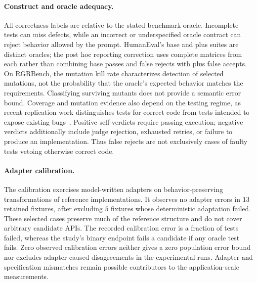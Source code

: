 \documentclass{article}
\begin{document}
\paragraph{Construct and oracle adequacy.} All correctness labels are relative to the stated
benchmark oracle. Incomplete tests can miss defects, while an incorrect or underspecified oracle
contract can reject behavior allowed by the prompt. HumanEval's base and plus suites are distinct
oracles; the post hoc reporting correction uses complete matrices from each rather than combining
base passes and false rejects with plus false accepts. On RGRBench, the mutation kill rate
characterizes detection of selected mutations, not the probability that the oracle's expected
behavior matches the requirements. Classifying surviving mutants does not provide a semantic
error bound. Coverage and mutation evidence also depend on the testing regime, as recent
replication work distinguishes tests for correct code from tests intended to expose existing
bugs~\cite{zhao2026coverage}. Positive self-verdicts require passing execution; negative verdicts additionally
include judge rejection, exhausted retries, or failure to produce an implementation. Thus false
rejects are not exclusively cases of faulty tests vetoing otherwise correct code.

\paragraph{Adapter calibration.} The calibration exercises model-written adapters on
behavior-preserving transformations of reference implementations. It observes no adapter errors
in $13$ retained fixtures, after excluding $5$ fixtures whose deterministic adaptation failed.
These selected cases preserve much of the reference structure and do not cover arbitrary
candidate APIs. The recorded calibration error is a fraction of tests failed, whereas the study's
binary endpoint fails a candidate if any oracle test fails. Zero observed calibration errors
neither gives a zero population error bound nor excludes adapter-caused disagreements in the
experimental runs. Adapter and specification mismatches remain possible contributors to the
application-scale measurements.
\end{document}
